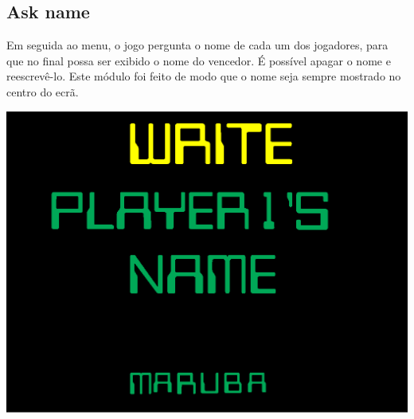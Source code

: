 \documentclass[12pt]{article}
\begin{document}
\subsection{Ask name}
Em seguida ao menu, o jogo pergunta o nome de cada um dos jogadores, para que no final possa
ser exibido o nome do vencedor. É possível apagar o nome e reescrevê-lo. Este módulo foi feito de modo que
o nome seja sempre mostrado no centro do ecrã. 
\begin{center}
    \includegraphics[width = 14cm]{askname.png}
\end{center}
\newpage
\end{document}
